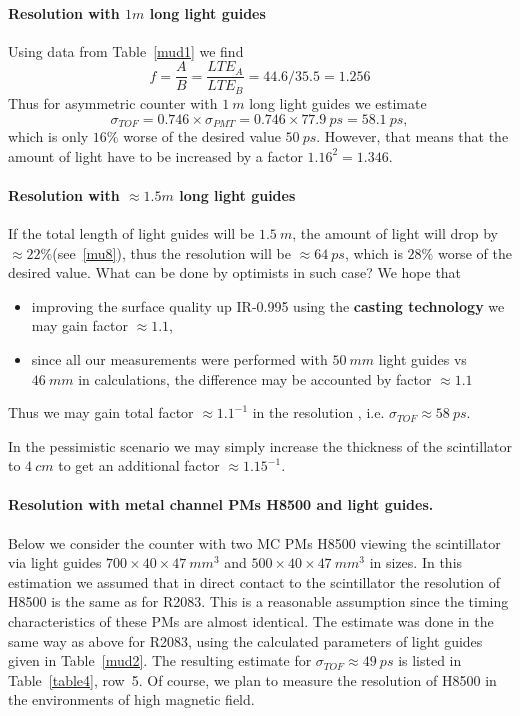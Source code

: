 \paragraph{Resolution  with  $1m$ long light guides}

Using data from Table~\ref{mud1}  we find  
\begin{equation}
  f = \frac{A}{B}=\frac{LTE_A}{LTE_B}=44.6/35.5=1.256
\label{eq2}
\end{equation}
Thus for asymmetric counter with $1~m$ long light guides we estimate
%
\begin{equation}
\sigma_{TOF}=0.746\times\sigma_{PMT}=0.746\times77.9~ps=58.1~ps,
\label{eq3}
\end{equation}    
%
which is  only $16\%$ worse of the desired value $50~ps$. However, that means that the amount of light have to be
increased by a factor $1.16^2=1.346$.


\paragraph{Resolution with  $\approx1.5m$ long 
light guides}

If the total length of light guides will be $1.5~m$, 
the amount of light will drop by $\approx 22\%$(see~\ref{mu8}), 
thus the resolution will be $\approx 64~ps$, which is $28\%$ worse of the  desired value.
What can be done by optimists  in such case? We hope that
\begin{itemize}
\item
improving the surface quality up IR-0.995 using the \textbf{casting technology} 
we may gain factor $\approx1.1$,
\item
since all our measurements were performed with $50~mm$ 
light guides vs $46~mm$ in calculations,  the difference 
may be accounted by factor $\approx1.1$
\end{itemize}
Thus we may  gain  total  factor  $\approx1.1^{-1}$ in the resolution , i.e. $\sigma_{TOF}\approx 58~ps$.

In the pessimistic scenario
we may  simply  increase the thickness of the scintillator 
to $4~cm$ to get an additional  factor $\approx1.15^{-1}$.

\paragraph{Resolution  with metal channel PMs H8500 and light guides.}
Below we consider the counter with two MC PMs H8500 
viewing the  scintillator via  light guides $700\times 40\times 47~mm^3$ and 
$500\times 40\times 47~mm^3$ in sizes.
In this estimation
we assumed that in direct contact to the scintillator the 
resolution of  H8500 is the same as for R2083. This is a reasonable
 assumption since the timing characteristics of these PMs are 
almost identical.
The estimate was done in the same way as above for R2083,
 using the calculated parameters of light guides given in  Table~\ref{mud2}. 
The resulting estimate for 
$\sigma_{TOF}\approx 49~ps$ is listed  in Table~\ref{table4}, row~5.
Of course, we plan  to  measure  the resolution of H8500 
 in the environments of high magnetic field.

